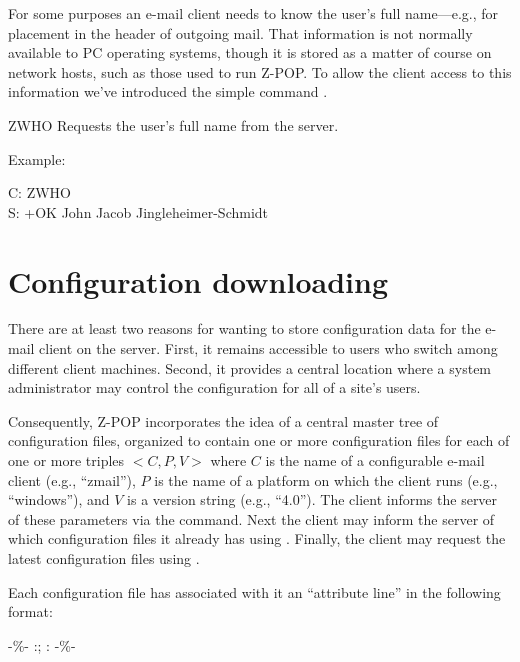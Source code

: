 For some purposes an e-mail client needs to know the user's full
name---e.g., for placement in the  header of outgoing mail.
That information is not normally available to PC operating systems,
though it is stored as a matter of course on network hosts, such as
those used to run Z-POP.  To allow the client access to this
information we've introduced the simple command .

\begin{codelist}
\item[ZWHO] Requests the user's full name from the server.

Example:

\begin{conversation}
C: ZWHO \\
S: +OK John Jacob Jingleheimer-Schmidt
\end{conversation}
\end{codelist}

\section{Configuration downloading}

There are at least two reasons for wanting to store configuration data
for the e-mail client on the server.  First, it remains accessible to
users who switch among different client machines.  Second, it provides
a central location where a system administrator may control the
configuration for all of a site's users.

Consequently, Z-POP incorporates the idea of a central master tree of
configuration files, organized to contain one or more configuration
files for each of one or more triples $<C,P,V>$ where $C$ is the name
of a configurable e-mail client (e.g., ``zmail''), $P$ is the name of
a platform on which the client runs (e.g., ``windows''), and $V$ is a
version string (e.g., ``4.0'').  The client informs the server of
these parameters via the  command.  Next the client may
inform the server of which configuration files it already has using
.  Finally, the client may request the latest configuration
files using .

Each configuration file has associated with it an ``attribute line''
in the following format:

\begin{example}
-\%- :; : -\%-
\end{example}

